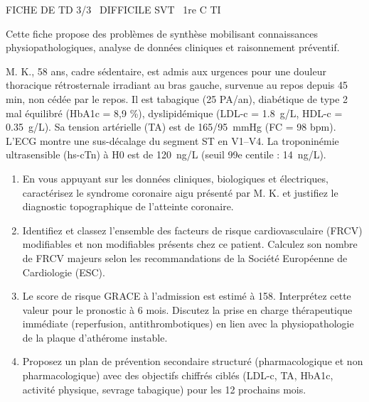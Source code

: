 \documentclass[11pt]{article}
\begin{document}
\begin{tcolorbox}[enhanced,colback=popink,colframe=popink,arc=10pt,boxrule=0pt,left=12pt,right=12pt,top=9pt,bottom=9pt]
{\color{white}\popxbold\small FICHE DE TD 3/3 \textbullet\ DIFFICILE \hfill SVT \textbullet\ 1re C TI\par}
\end{tcolorbox}
\vspace{4pt}
Cette fiche propose des problèmes de synthèse mobilisant connaissances physiopathologiques, analyse de données cliniques et raisonnement préventif.

\begin{exercice}
M. K., 58 ans, cadre sédentaire, est admis aux urgences pour une douleur thoracique rétrosternale irradiant au bras gauche, survenue au repos depuis 45 min, non cédée par le repos. Il est tabagique (25 PA/an), diabétique de type 2 mal équilibré (HbA1c = 8,9 \%), dyslipidémique (LDL-c = \SI{1,8}{g/L}, HDL-c = \SI{0,35}{g/L}). Sa tension artérielle (TA) est de \SI{165/95}{mmHg} (FC = 98 bpm). L'ECG montre une sus-décalage du segment ST en V1--V4. La troponinémie ultrasensible (hs-cTn) à H0 est de \SI{120}{ng/L} (seuil 99e centile : \SI{14}{ng/L}).
\begin{enumerate}
    \item En vous appuyant sur les données cliniques, biologiques et électriques, caractérisez le syndrome coronaire aigu présenté par M. K. et justifiez le diagnostic topographique de l'atteinte coronaire.
    \item Identifiez et classez l'ensemble des facteurs de risque cardiovasculaire (FRCV) modifiables et non modifiables présents chez ce patient. Calculez son nombre de FRCV majeurs selon les recommandations de la Société Européenne de Cardiologie (ESC).
    \item Le score de risque GRACE à l'admission est estimé à 158. Interprétez cette valeur pour le pronostic à 6 mois. Discutez la prise en charge thérapeutique immédiate (reperfusion, antithrombotiques) en lien avec la physiopathologie de la plaque d'athérome instable.
    \item Proposez un plan de prévention secondaire structuré (pharmacologique et non pharmacologique) avec des objectifs chiffrés ciblés (LDL-c, TA, HbA1c, activité physique, sevrage tabagique) pour les 12 prochains mois.
\end{enumerate}
\end{exercice}
\end{document}
